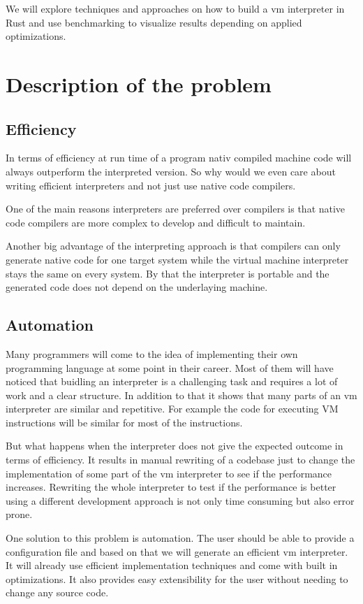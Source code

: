 \documentclass{article}
\begin{document}
We will explore techniques and approaches on how to build a vm interpreter in Rust and
use benchmarking to visualize results depending on applied optimizations.

\section{Description of the problem}
\subsection{Efficiency}
In terms of efficiency at run time of a program nativ compiled machine code
will always outperform the interpreted version. So why would we even care
about writing efficient interpreters and not just use native code compilers.

One of the main reasons interpreters are preferred over compilers is that 
native code compilers are more complex to develop and difficult to maintain.
~\cite{structure_and_performance}

Another big advantage of the interpreting approach is that compilers can only
generate native code for one target system while the virtual machine
interpreter stays the same on every system. By that the interpreter is portable
and the generated code does not depend on the underlaying machine.

\subsection{Automation}
Many programmers will come to the idea of implementing their own programming
language at some point in their career. Most of them will have noticed that
buidling an interpreter is a challenging task and requires a lot of work and
a clear structure. In addition to that it shows that many parts of an vm
interpreter are similar and repetitive. For example the code for executing 
VM instructions will be similar for most of the instructions. ~\cite{vmgen}

But what happens when the interpreter does not give the expected outcome in
terms of efficiency. It results in manual rewriting of a codebase just to
change the implementation of some part of the vm interpreter to see if the
performance increases.
Rewriting the whole interpreter to test if the performance is better using
a different development approach is not only time consuming but also error 
prone.

One solution to this problem is automation. The user should be able to provide
a configuration file and based on that we will generate an efficient vm 
interpreter. It will already use efficient implementation techniques and come
with built in optimizations. It also provides easy extensibility for the user
without needing to change any source code.
\end{document}
